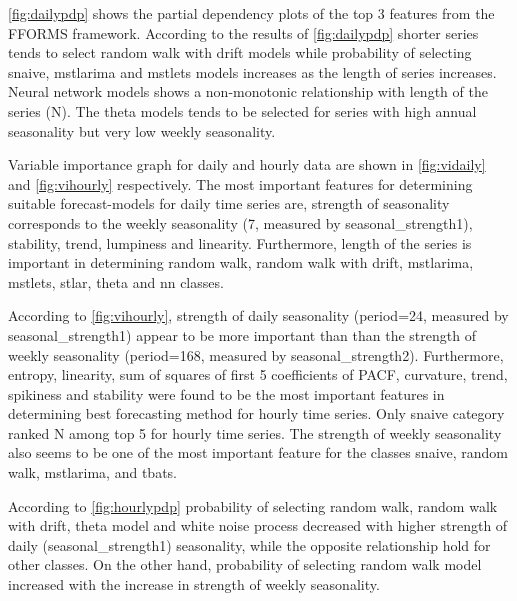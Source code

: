 \documentclass[11pt,a4paper,]{article}
\begin{document}
\autoref{fig:dailypdp} shows the partial dependency plots of the top 3
features from the FFORMS framework. According to the results of
\autoref{fig:dailypdp} shorter series tends to select random walk with
drift models while probability of selecting snaive, mstlarima and
mstlets models increases as the length of series increases. Neural
network models shows a non-monotonic relationship with length of the
series (N). The theta models tends to be selected for series with high
annual seasonality but very low weekly seasonality.

Variable importance graph for daily and hourly data are shown in
\autoref{fig:vidaily} and \autoref{fig:vihourly} respectively. The most
important features for determining suitable forecast-models for daily
time series are, strength of seasonality corresponds to the weekly
seasonality (7, measured by seasonal\_strength1), stability, trend,
lumpiness and linearity. Furthermore, length of the series is important
in determining random walk, random walk with drift, mstlarima, mstlets,
stlar, theta and nn classes.

According to \autoref{fig:vihourly}, strength of daily seasonality
(period=24, measured by seasonal\_strength1) appear to be more important
than than the strength of weekly seasonality (period=168, measured by
seasonal\_strength2). Furthermore, entropy, linearity, sum of squares of
first 5 coefficients of PACF, curvature, trend, spikiness and stability
were found to be the most important features in determining best
forecasting method for hourly time series. Only snaive category ranked N
among top 5 for hourly time series. The strength of weekly seasonality
also seems to be one of the most important feature for the classes
snaive, random walk, mstlarima, and tbats.

According to \autoref{fig:hourlypdp} probability of selecting random
walk, random walk with drift, theta model and white noise process
decreased with higher strength of daily (seasonal\_strength1)
seasonality, while the opposite relationship hold for other classes. On
the other hand, probability of selecting random walk model increased
with the increase in strength of weekly seasonality.
\end{document}
